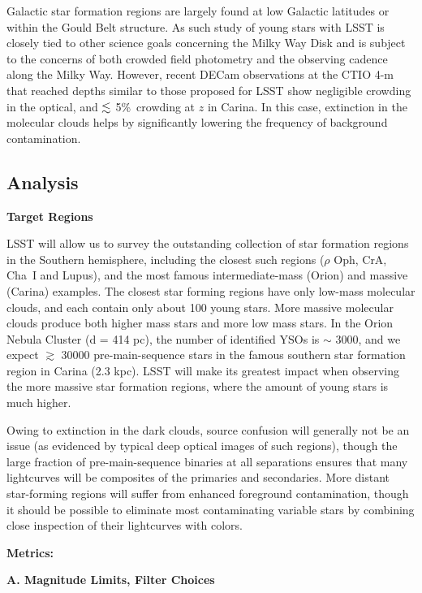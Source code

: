 Galactic star formation regions are largely found at low Galactic
latitudes or within the Gould Belt structure. As such study of young
stars with LSST is closely tied to other science goals concerning the
Milky Way Disk and is subject to the concerns of both crowded field
photometry and the observing cadence along the Milky Way. However, recent
DECam observations at the CTIO 4-m that reached depths similar to those
proposed for LSST show negligible crowding in the optical, and $\lesssim$
5\%\ crowding at $z$ in Carina. In this case, extinction in the molecular
clouds helps by significantly lowering the frequency of background contamination. 


\subsection{Analysis}
\label{sec:\secname:analysis}

{\bf Target Regions}

LSST will allow us to survey the outstanding collection of 
star formation regions in the Southern hemisphere, including the closest
such regions ($\rho$ Oph, CrA, Cha~I and Lupus), and the most famous intermediate-mass
(Orion) and massive (Carina) examples. 
The closest star forming regions have only low-mass molecular clouds, and each contain
only about 100 young stars. More massive molecular clouds produce both higher
mass stars and more low mass stars. In the Orion Nebula Cluster (d = 414 pc), the number of
identified YSOs is $\sim$ 3000, and we expect $\gtrsim$ 30000 pre-main-sequence
stars in the famous southern star formation region in Carina (2.3 kpc).
LSST will make its greatest impact
when observing the more massive star formation regions, where the amount
of young stars is much higher.

Owing to extinction in the dark clouds,
source confusion will generally not be an issue (as evidenced by typical
deep optical images of such regions), though the large fraction
of pre-main-sequence binaries at all separations ensures that many
lightcurves will be composites of the primaries and secondaries.
More distant star-forming regions will suffer from enhanced foreground
contamination, though it should be possible to eliminate most contaminating
variable stars by combining close inspection of their lightcurves with
colors.

{\bf Metrics:}

{\bf A. Magnitude Limits, Filter Choices}

